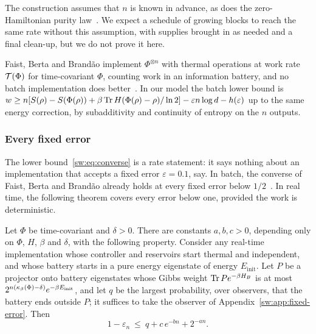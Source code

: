 \begin{remark}\label{sw:rem:horizon}
The construction assumes that $n$ is known in advance, as does the zero-Hamiltonian purity law~\cite{Douglas26closed}. We expect a schedule of growing blocks to reach the same rate without this assumption, with supplies brought in as needed and a final clean-up, but we do not prove it here.
\end{remark}

\begin{remark}[Batch]\label{sw:rem:batch}
Faist, Berta and Brand\~ao implement $\Phi^{\otimes n}$ with thermal operations at work rate $\mathcal T(\Phi)$ for time-covariant $\Phi$, counting work in an information battery, and no batch implementation does better~\cite[Thm.~7.1, Prop.~4.2]{FBB21}. In our model the batch lower bound is $w\ge n[S(\rho)-S(\Phi(\rho))+\beta\operatorname{Tr} H(\Phi(\rho)-\rho)/\ln2]-\varepsilon n\log d-h(\varepsilon)$ up to the same energy correction, by subadditivity and continuity of entropy on the $n$ outputs.
\end{remark}

\subsubsection{Every fixed error}\label{sw:sec:fixed-error}

The lower bound~\eqref{sw:eq:converse} is a rate statement: it says nothing about an implementation that accepts a fixed error $\varepsilon=0.1$, say. In batch, the converse of Faist, Berta and Brand\~ao already holds at every fixed error below $1/2$~\cite[Prop.~4.2]{FBB21}. In real time, the following theorem covers every error below one, provided the work is deterministic.

\begin{theorem}\label{sw:thm:fixed-error}
Let $\Phi$ be time-covariant and $\delta>0$. There are constants $a,b,c>0$, depending only on $\Phi$, $H$, $\beta$ and $\delta$, with the following property. Consider any real-time implementation whose controller and reservoirs start thermal and independent, and whose battery starts in a pure energy eigenstate of energy $E_{\mathrm{init}}$. Let $P$ be a projector onto battery eigenstates whose Gibbs weight $\operatorname{Tr} Pe^{-\beta H_B}$ is at most $2^{n(\kappa_\beta(\Phi)-\delta)}e^{-\beta E_{\mathrm{init}}}$, and let $q$ be the largest probability, over observers, that the battery ends outside $P$; it suffices to take the observer of Appendix~\ref{sw:app:fixed-error}. Then
\[
1-\varepsilon_n\ \le\ q+c\,e^{-bn}+2^{-an}.
\]
\end{theorem}

